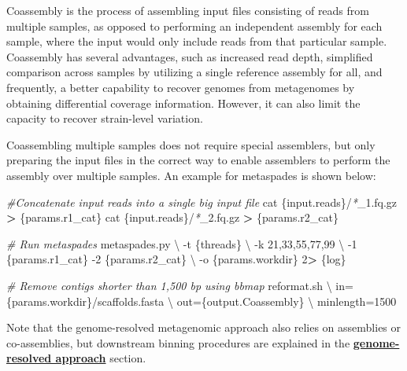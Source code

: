 \documentclass[
]{book}
\newenvironment{Shaded}{\begin{snugshade}}{\end{snugshade}}
\newcommand{\AttributeTok}[1]{\textcolor[rgb]{0.77,0.63,0.00}{#1}}
\newcommand{\CommentTok}[1]{\textcolor[rgb]{0.56,0.35,0.01}{\textit{#1}}}
\newcommand{\DataTypeTok}[1]{\textcolor[rgb]{0.13,0.29,0.53}{#1}}
\newcommand{\DecValTok}[1]{\textcolor[rgb]{0.00,0.00,0.81}{#1}}
\newcommand{\ExtensionTok}[1]{#1}
\newcommand{\FunctionTok}[1]{\textcolor[rgb]{0.00,0.00,0.00}{#1}}
\newcommand{\NormalTok}[1]{#1}
\newcommand{\OperatorTok}[1]{\textcolor[rgb]{0.81,0.36,0.00}{\textbf{#1}}}
\newcommand{\PreprocessorTok}[1]{\textcolor[rgb]{0.56,0.35,0.01}{\textit{#1}}}
\begin{document}
Coassembly is the process of assembling input files consisting of reads from multiple samples, as opposed to performing an independent assembly for each sample, where the input would only include reads from that particular sample. Coassembly has several advantages, such as increased read depth, simplified comparison across samples by utilizing a single reference assembly for all, and frequently, a better capability to recover genomes from metagenomes by obtaining differential coverage information. However, it can also limit the capacity to recover strain-level variation.

Coassembling multiple samples does not require special assemblers, but only preparing the input files in the correct way to enable assemblers to perform the assembly over multiple samples. An example for metaspades is shown below:

\begin{Shaded}
\begin{Highlighting}[]
\CommentTok{\#Concatenate input reads into a single big input file}
\FunctionTok{cat}\NormalTok{ \{input.reads\}/}\PreprocessorTok{*}\NormalTok{\_1.fq.gz }\OperatorTok{\textgreater{}}\NormalTok{ \{params.r1\_cat\}}
\FunctionTok{cat}\NormalTok{ \{input.reads\}/}\PreprocessorTok{*}\NormalTok{\_2.fq.gz }\OperatorTok{\textgreater{}}\NormalTok{ \{params.r2\_cat\}}

\CommentTok{\# Run metaspades}
\ExtensionTok{metaspades.py} \DataTypeTok{\textbackslash{}}
    \AttributeTok{{-}t}\NormalTok{ \{threads\} }\DataTypeTok{\textbackslash{}}
    \AttributeTok{{-}k}\NormalTok{ 21,33,55,77,99 }\DataTypeTok{\textbackslash{}}
    \AttributeTok{{-}1}\NormalTok{ \{params.r1\_cat\} }\AttributeTok{{-}2}\NormalTok{ \{params.r2\_cat\} }\DataTypeTok{\textbackslash{}}
    \AttributeTok{{-}o}\NormalTok{ \{params.workdir\}}
    \DecValTok{2}\OperatorTok{\textgreater{}}\NormalTok{ \{log\}}

\CommentTok{\# Remove contigs shorter than 1,500 bp using bbmap}
\ExtensionTok{reformat.sh} \DataTypeTok{\textbackslash{}}
\NormalTok{    in=\{params.workdir\}/scaffolds.fasta }\DataTypeTok{\textbackslash{}}
\NormalTok{    out=\{output.Coassembly\} }\DataTypeTok{\textbackslash{}}
\NormalTok{    minlength=1500}
\end{Highlighting}
\end{Shaded}

Note that the genome-resolved metagenomic approach also relies on assemblies or co-assemblies, but downstream binning procedures are explained in the \textbf{\protect\hyperlink{genome-resolved}{genome-resolved approach}} section.
\end{document}
